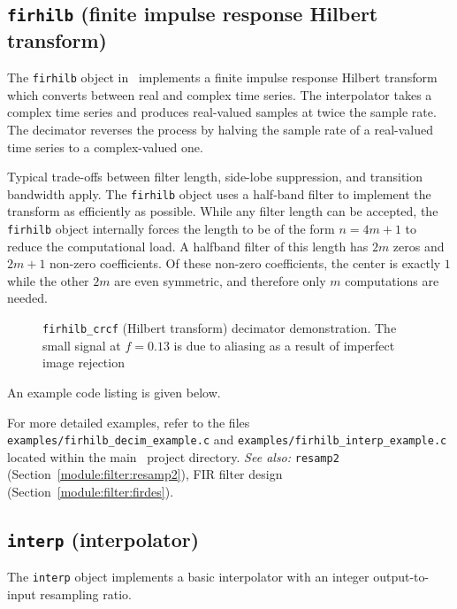 % 
%
\subsection{{\tt firhilb} (finite impulse response Hilbert transform)}
\label{module:filter:firhilb}
The {\tt firhilb} object in \liquid\ implements a finite impulse
response Hilbert transform which
converts between real and complex time series.
The interpolator takes a complex time series and produces real-valued
samples at twice the sample rate.
The decimator reverses the process by halving the sample rate of a
real-valued time series to a complex-valued one.

Typical trade-offs between filter length, side-lobe suppression, and
transition bandwidth apply.
The {\tt firhilb} object uses a half-band filter to implement the
transform as efficiently as possible.
While any filter length can be accepted, the {\tt firhilb} object
internally forces the length to be of the form $n=4m+1$
to reduce the computational load.
A halfband filter of this length has $2m$ zeros and $2m+1$ non-zero
coefficients.
Of these non-zero coefficients, the center is exactly $1$ while the other $2m$
are even symmetric, and therefore only $m$ computations are needed.
%
\begin{figure}
\centering
{}
\caption{{\tt firhilb\_crcf} (Hilbert transform) decimator demonstration. The
small signal at $f=0.13$ is due to aliasing as a result of imperfect image
rejection}
\label{fig:module:filter:firhilb_crcf}
\end{figure}
%
An example code listing is given below.
%

%
For more detailed examples, refer to the files
{\tt examples/firhilb\_decim\_example.c} and
{\tt examples/firhilb\_interp\_example.c}
located within the main \liquid\ project directory.
%
{\it See also:} {\tt resamp2} (Section~\ref{module:filter:resamp2}),
FIR filter design (Section~\ref{module:filter:firdes}).


% 
%

\subsection{{\tt interp} (interpolator)}
The {\tt interp} object implements a basic interpolator with an integer
output-to-input resampling ratio.

